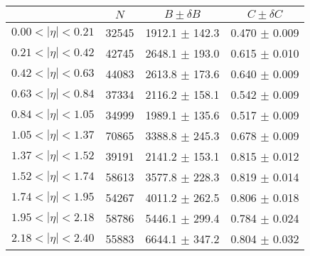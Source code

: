 \begin{tabular}{lccc}
\hline
    &   $N$   & $B \pm \delta B$  &  $C \pm \delta C$ \\
\hline
$0.00 < |\eta| <0.21$          & 32545      & 1912.1     $\pm$ 142.3 & 0.470      $\pm$ 0.009 \\
$0.21 < |\eta| <0.42$          & 42745      & 2648.1     $\pm$ 193.0 & 0.615      $\pm$ 0.010 \\
$0.42 < |\eta| <0.63$          & 44083      & 2613.8     $\pm$ 173.6 & 0.640      $\pm$ 0.009 \\
$0.63 < |\eta| <0.84$          & 37334      & 2116.2     $\pm$ 158.1 & 0.542      $\pm$ 0.009 \\
$0.84 < |\eta| <1.05$          & 34999      & 1989.1     $\pm$ 135.6 & 0.517      $\pm$ 0.009 \\
$1.05 < |\eta| <1.37$          & 70865      & 3388.8     $\pm$ 245.3 & 0.678      $\pm$ 0.009 \\
$1.37 < |\eta| <1.52$          & 39191      & 2141.2     $\pm$ 153.1 & 0.815      $\pm$ 0.012 \\
$1.52 < |\eta| <1.74$          & 58613      & 3577.8     $\pm$ 228.3 & 0.819      $\pm$ 0.014 \\
$1.74 < |\eta| <1.95$          & 54267      & 4011.2     $\pm$ 262.5 & 0.806      $\pm$ 0.018 \\
$1.95 < |\eta| <2.18$          & 58786      & 5446.1     $\pm$ 299.4 & 0.784      $\pm$ 0.024 \\
$2.18 < |\eta| <2.40$          & 55883      & 6644.1     $\pm$ 347.2 & 0.804      $\pm$ 0.032 \\
\hline
\end{tabular}
